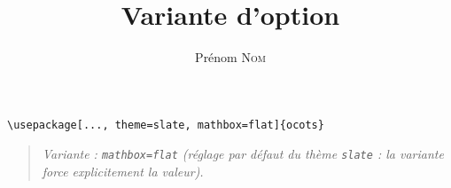 \documentclass[11pt]{ocots-book}
\title{Variante d'option}
\author{Prénom \textsc{Nom}}
\newcommand{\ocotsvariantnote}[1]{\begin{quote}\itshape Variante : #1\end{quote}}
\begin{document}
\maketitle

\begin{lstlisting}
\usepackage[..., theme=slate, mathbox=flat]{ocots}
\end{lstlisting}
\ocotsvariantnote{\texttt{mathbox=flat} (r\'eglage par d\'efaut du th\`eme \texttt{slate} : la variante force explicitement la valeur).}

\end{document}
